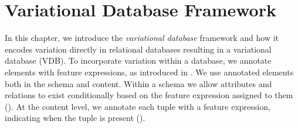 \chapter{Variational Database Framework}
\label{ch:vdb}

In this chapter, we introduce the \emph{variational database} framework and how it encodes
variation directly in relational databases resulting in a variational database (VDB).
To incorporate variation within a database, we annotate elements with feature expressions,
as introduced in . We use annotated elements both in the schema and content.
Within a schema we allow attributes and relations to exist 
conditionally based on the feature expression assigned to them ().
At the content level, we annotate each tuple with a feature expression, indicating when the tuple 
is present (). 



%



%
